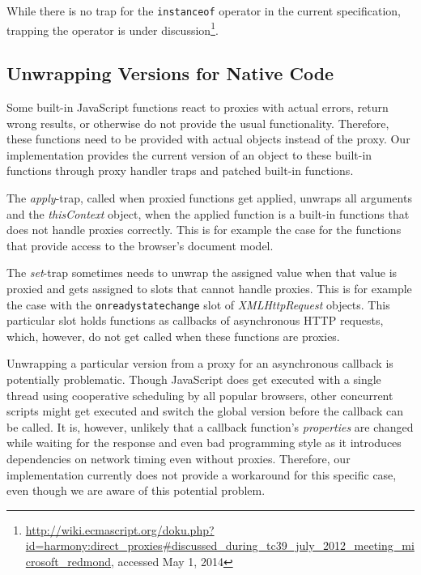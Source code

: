 While there is no trap for the \lstinline{instanceof} operator in the current specification, trapping the operator is under discussion\footnote{\url{http://wiki.ecmascript.org/doku.php?id=harmony:direct_proxies\#discussed_during_tc39_july_2012_meeting_microsoft_redmond}, accessed May 1, 2014}.


\subsection{Unwrapping Versions for Native Code}

Some built-in JavaScript functions react to proxies with actual errors, return wrong results, or otherwise do not provide the usual functionality.
Therefore, these functions need to be provided with actual objects instead of the proxy.
Our implementation provides the current version of an object to these built-in functions through proxy handler traps and patched built-in functions.

The \emph{apply}-trap, called when proxied functions get applied, unwraps all arguments and the \emph{thisContext} object, when the applied function is a built-in functions that does not handle proxies correctly.
This is for example the case for the functions that provide access to the browser's document model.

The \emph{set}-trap sometimes needs to unwrap the assigned value when that value is proxied and gets assigned to slots that cannot handle proxies.
This is for example the case with the \lstinline{onreadystatechange} slot of \emph{XMLHttpRequest} objects.
This particular slot holds functions as callbacks of asynchronous HTTP requests, which, however, do not get called when these functions are proxies.

Unwrapping a particular version from a proxy for an asynchronous callback is potentially problematic.
Though JavaScript does get executed with a single thread using cooperative scheduling by all popular browsers, other concurrent scripts might get executed and switch the global version before the callback can be called.
It is, however, unlikely that a callback function's \emph{properties} are changed while waiting for the response and even bad programming style as it introduces dependencies on network timing even without proxies.
Therefore, our implementation currently does not provide a workaround for this specific case, even though we are aware of this potential problem. 

